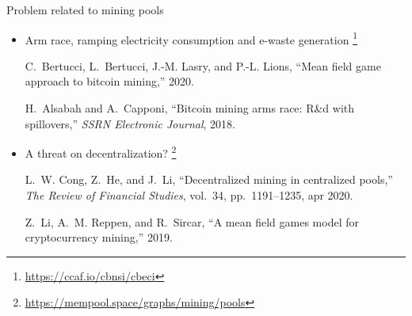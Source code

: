 \documentclass{beamer}
\newcommand\blfootnote[1]{%
  \begingroup
  \renewcommand\thefootnote{}\footnote{#1}%
  \addtocounter{footnote}{-1}%
  \endgroup
}
\begin{document}
\begin{frame}{Problem related to mining pools}
\begin{itemize}
  \item Arm race, ramping electricity consumption and e-waste generation\blfootnote{\url{https://ccaf.io/cbnsi/cbeci}}
\tiny
\begin{thebibliography}{1}

C.~Bertucci, L.~Bertucci, J.-M. Lasry, and P.-L. Lions, ``Mean field game
  approach to bitcoin mining,'' 2020.

H.~Alsabah and A.~Capponi, ``Bitcoin mining arms race: R{\&}d with
  spillovers,'' {\em {SSRN} Electronic Journal}, 2018.

\end{thebibliography}
\end{itemize}
\begin{itemize}
  \item \normalsize A threat on decentralization?\blfootnote{\url{https://mempool.space/graphs/mining/pools}}
\tiny
\begin{thebibliography}{1}

L.~W. Cong, Z.~He, and J.~Li, ``Decentralized mining in centralized pools,''
  {\em The Review of Financial Studies}, vol.~34, pp.~1191--1235, apr 2020.

Z.~Li, A.~M. Reppen, and R.~Sircar, ``A mean field games model for
  cryptocurrency mining,'' 2019.
\end{thebibliography}
\end{itemize}
\end{frame}
% 
% 
\end{document}
